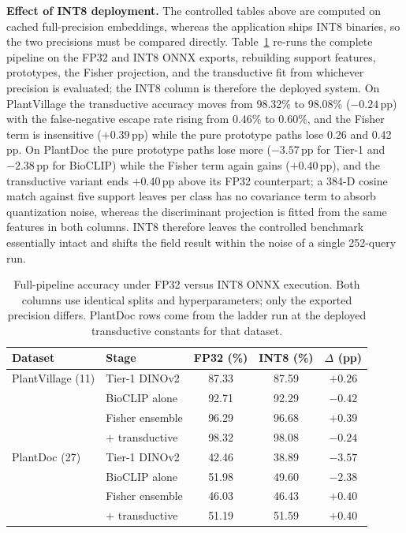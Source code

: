 \textbf{Effect of INT8 deployment.} The controlled tables above are computed on cached full-precision embeddings, whereas the application ships INT8 binaries, so the two precisions must be compared directly. Table~\ref{tab:quantization} re-runs the complete pipeline on the FP32 and INT8 ONNX exports, rebuilding support features, prototypes, the Fisher projection, and the transductive fit from whichever precision is evaluated; the INT8 column is therefore the deployed system. On PlantVillage the transductive accuracy moves from 98.32\% to 98.08\% ($-0.24$\,pp) with the false-negative escape rate rising from 0.46\% to 0.60\%, and the Fisher term is insensitive ($+0.39$\,pp) while the pure prototype paths lose 0.26 and 0.42\,pp. On PlantDoc the pure prototype paths lose more ($-3.57$\,pp for Tier-1 and $-2.38$\,pp for BioCLIP) while the Fisher term again gains ($+0.40$\,pp), and the transductive variant ends $+0.40$\,pp above its FP32 counterpart; a 384-D cosine match against five support leaves per class has no covariance term to absorb quantization noise, whereas the discriminant projection is fitted from the same features in both columns. INT8 therefore leaves the controlled benchmark essentially intact and shifts the field result within the noise of a single 252-query run.

\begin{table}[htbp]
\caption{Full-pipeline accuracy under FP32 versus INT8 ONNX execution. Both columns use identical splits and hyperparameters; only the exported precision differs. PlantDoc rows come from the ladder run at the deployed transductive constants for that dataset.}
\label{tab:quantization}
\centering

\footnotesize
\setlength{\tabcolsep}{4pt}
\begin{tabular*}{\columnwidth}{@{\extracolsep{\fill}}llccc}
\toprule
\textbf{Dataset} & \textbf{Stage} & \textbf{FP32 (\%)} & \textbf{INT8 (\%)} & \textbf{$\Delta$ (pp)} \\
\midrule
PlantVillage (11) & Tier-1 DINOv2 & 87.33 & 87.59 & $+0.26$ \\
 & BioCLIP alone & 92.71 & 92.29 & $-0.42$ \\
 & Fisher ensemble & 96.29 & 96.68 & $+0.39$ \\
 & $+$ transductive & 98.32 & 98.08 & $-0.24$ \\
\midrule
PlantDoc (27) & Tier-1 DINOv2 & 42.46 & 38.89 & $-3.57$ \\
 & BioCLIP alone & 51.98 & 49.60 & $-2.38$ \\
 & Fisher ensemble & 46.03 & 46.43 & $+0.40$ \\
 & $+$ transductive & 51.19 & 51.59 & $+0.40$ \\
\bottomrule
\end{tabular*}
\end{table}


